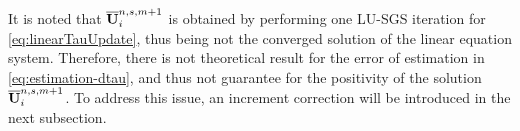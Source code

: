 
It is noted that $\overline{\mathbf{U}}^{n,s,m+1}_i$ is obtained by performing one LU-SGS iteration for \eqref{eq:linearTauUpdate}, thus being not the converged solution of the linear equation system. Therefore, there is not theoretical result for the error of estimation in \eqref{eq:estimation-dtau}, and thus not guarantee for the positivity of the solution $\overline{\mathbf{U}}^{n,s,m+1}_i$. To address this issue, an increment correction will be introduced in the next subsection.

